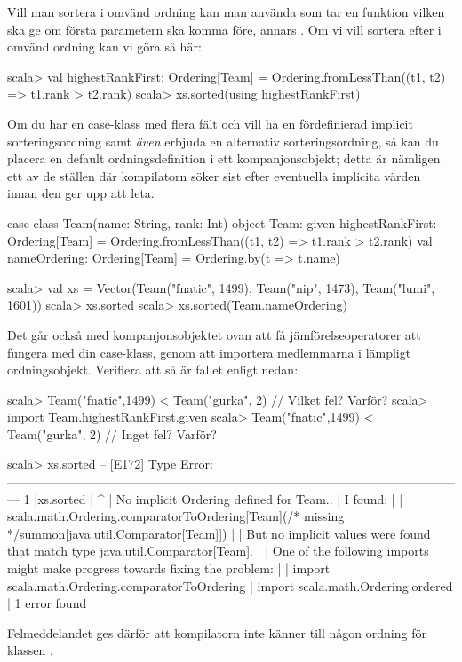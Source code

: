 \Subtask Vill man sortera i omvänd ordning kan man använda
 som tar en funktion  vilken ska ge  om första parametern ska komma före, annars . Om vi vill sortera efter  i omvänd ordning kan vi göra så här:
\begin{REPL}
scala> val highestRankFirst: Ordering[Team] =
         Ordering.fromLessThan((t1, t2) => t1.rank > t2.rank)
scala> xs.sorted(using highestRankFirst)
\end{REPL}

\Subtask Om du har en case-klass med flera fält och vill ha en fördefinierad implicit sorteringsordning samt \emph{även} erbjuda en alternativ sorteringsordning, så kan du placera en default ordningsdefinition i ett kompanjonsobjekt; detta är nämligen ett av de ställen där kompilatorn söker sist efter eventuella implicita värden innan den ger upp att leta.
\begin{Code}
case class Team(name: String, rank: Int)
object Team:
  given highestRankFirst: Ordering[Team] = 
    Ordering.fromLessThan((t1, t2) => t1.rank > t2.rank)
  val nameOrdering: Ordering[Team] = Ordering.by(t => t.name)
\end{Code}
\begin{REPL}
scala> val xs =
         Vector(Team("fnatic", 1499), Team("nip", 1473), Team("lumi", 1601))
scala> xs.sorted
scala> xs.sorted(Team.nameOrdering)
\end{REPL}



\Subtask Det går också med kompanjonsobjektet ovan att få jämförelseoperatorer att fungera med din case-klass, genom att importera medlemmarna i lämpligt ordningsobjekt. Verifiera att så är fallet enligt nedan:
\begin{REPL}
scala> Team("fnatic",1499) < Team("gurka", 2)  // Vilket fel? Varför?
scala> import Team.highestRankFirst.given
scala> Team("fnatic",1499) < Team("gurka", 2)  // Inget fel? Varför?
\end{REPL}


\SOLUTION

\TaskSolved \what 

\SubtaskSolved
\begin{REPLnonum}
scala> xs.sorted
-- [E172] Type Error: ---------------------------------------------------------------------------------------------------------------
1 |xs.sorted
  |         ^
  | No implicit Ordering defined for Team..
  | I found:
  |
  |     scala.math.Ordering.comparatorToOrdering[Team](/* missing */summon[java.util.Comparator[Team]])
  |
  | But no implicit values were found that match type java.util.Comparator[Team].
  |
  | One of the following imports might make progress towards fixing the problem:
  |
  |     import scala.math.Ordering.comparatorToOrdering
  |     import scala.math.Ordering.ordered
  |
1 error found
\end{REPLnonum}
Felmeddelandet ges därför att kompilatorn inte känner till någon ordning för klassen . 

